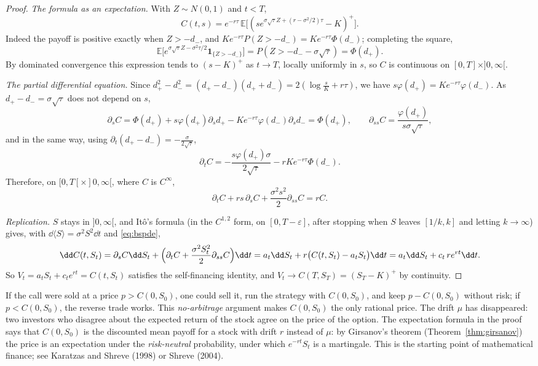 \begin{proof}
\emph{The formula as an expectation.} With $Z\sim N(0,1)$ and $t<T$,
\[
C(t,s)=e^{-r\tau}\,\mathbb E\bigl[(se^{\sigma\sqrt\tau Z+(r-\sigma^2/2)\tau}-K)^+\bigr].
\]
Indeed the payoff is positive exactly when $Z>-d_-$, and $Ke^{-r\tau}P(Z>-d_-)=Ke^{-r\tau}\Phi(d_-)$; completing the square,
\[
\mathbb E\bigl[e^{\sigma\sqrt\tau Z-\sigma^2\tau/2}\mathbf 1_{\{Z>-d_-\}}\bigr]=P(Z>-d_--\sigma\sqrt\tau)=\Phi(d_+).
\]
By dominated convergence this expression tends to $(s-K)^+$ as $t\to T$, locally uniformly in $s$, so $C$ is continuous on $[0,T]\times]0,\infty[$.

\emph{The partial differential equation.} Since $d_+^2-d_-^2=(d_+-d_-)(d_++d_-)=2(\log\frac sK+r\tau)$, we have $s\varphi(d_+)=Ke^{-r\tau}\varphi(d_-)$. As $d_+-d_-=\sigma\sqrt\tau$ does not depend on $s$,
\[
\partial_sC=\Phi(d_+)+s\varphi(d_+)\partial_sd_+-Ke^{-r\tau}\varphi(d_-)\partial_sd_-=\Phi(d_+),\qquad\partial_{ss}C=\frac{\varphi(d_+)}{s\sigma\sqrt\tau} ,
\]
and in the same way, using $\partial_t(d_+-d_-)=-\frac{\sigma}{2\sqrt\tau}$,
\[
\partial_tC=-\frac{s\varphi(d_+)\sigma}{2\sqrt\tau}-rKe^{-r\tau}\Phi(d_-).
\]
Therefore, on $[0,T[\times]0,\infty[$, where $C$ is $C^\infty$,
\begin{equation}\label{eq:bspde}
\partial_tC+rs\,\partial_sC+\frac{\sigma^2s^2}2\partial_{ss}C=rC.
\end{equation}

\emph{Replication.} $S$ stays in $]0,\infty[$, and It\^o's formula (in the $C^{1,2}$ form, on $[0,T-\varepsilon]$, after stopping when $S$ leaves $[1/k,k]$ and letting $k\to\infty$) gives, with
$\dd\langle S\rangle=\sigma^2S^2\dd t$ and \eqref{eq:bspde},
\[
\dd C(t,S_t)=\partial_sC\dd S_t+\Bigl(\partial_tC+\frac{\sigma^2S_t^2}2\partial_{ss}C\Bigr)\dd t=a_t\dd S_t+r\bigl(C(t,S_t)-a_tS_t\bigr)\dd t=a_t\dd S_t+c_t\,re^{rt}\dd t.
\]
So $V_t=a_tS_t+c_te^{rt}=C(t,S_t)$ satisfies the self-financing identity, and $V_t\to C(T,S_T)=(S_T-K)^+$ by continuity.
\end{proof}

\begin{remark}
If the call were sold at a price $p>C(0,S_0)$, one could sell it, run the strategy with $C(0,S_0)$, and keep $p-C(0,S_0)$ without risk; if $p<C(0,S_0)$, the reverse trade works. This \emph{no-arbitrage}
argument makes $C(0,S_0)$ the only rational price. The drift $\mu$ has disappeared: two investors who disagree about the expected return of the stock agree on the price of the option. The expectation
formula in the proof says that $C(0,S_0)$ is the discounted mean payoff for a stock with drift $r$ instead of $\mu$: by Girsanov's theorem (Theorem~\ref{thm:girsanov}) the price is an expectation under the
\emph{risk-neutral} probability, under which $e^{-rt}S_t$ is a martingale. This is the starting point of mathematical finance; see Karatzas and Shreve (1998) or Shreve (2004).
\end{remark}

